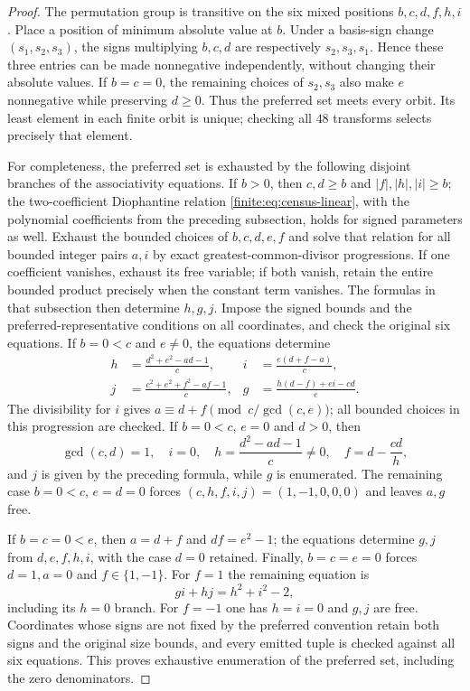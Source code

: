 \begin{proof}
The permutation group is transitive on the six mixed positions
$b,c,d,f,h,i$. Place a position of minimum absolute value at $b$.
Under a basis-sign change $(s_1,s_2,s_3)$, the signs multiplying
$b,c,d$ are respectively $s_2,s_3,s_1$. Hence these three entries
can be made nonnegative independently, without changing their
absolute values. If $b=c=0$, the remaining choices of $s_2,s_3$
also make $e$ nonnegative while preserving $d\geq0$.
Thus the preferred set meets every orbit. Its least element in
each finite orbit is unique; checking all $48$ transforms selects
precisely that element.

For completeness, the preferred set is exhausted by the following
disjoint branches of the associativity equations. If $b>0$, then
$c,d\geq b$ and $|f|,|h|,|i|\geq b$; the two-coefficient
Diophantine relation \eqref{finite:eq:census-linear}, with the polynomial
coefficients from the preceding subsection, holds for signed
parameters as well. Exhaust the bounded choices of $b,c,d,e,f$
and solve that relation for all bounded integer pairs $a,i$ by
exact greatest-common-divisor progressions. If one coefficient
vanishes, exhaust its free variable; if both vanish, retain the
entire bounded product precisely when the constant term vanishes.
The formulas in that subsection then determine $h,g,j$. Impose the
signed bounds and the preferred-representative conditions on all
coordinates, and check the original six equations.
If $b=0<c$ and $e\ne0$, the equations determine
\begin{align*}
 h&=\frac{d^2+e^2-ad-1}{c},&
 i&=\frac{e(d+f-a)}c,\\
 j&=\frac{c^2+e^2+f^2-af-1}{c},&
 g&=\frac{h(d-f)+ei-cd}{e}.
\end{align*}
The divisibility for $i$ gives
$a\equiv d+f\pmod{c/\gcd(c,e)}$; all bounded choices in this
progression are checked. If $b=0<c$, $e=0$ and $d>0$, then
\[
 \gcd(c,d)=1,\quad i=0,\quad
 h=\frac{d^2-ad-1}{c}\ne0,\quad f=d-\frac{cd}{h},
\]
and $j$ is given by the preceding formula, while $g$ is enumerated.
The remaining case $b=0<c$, $e=d=0$ forces
$(c,h,f,i,j)=(1,-1,0,0,0)$ and leaves $a,g$ free.

If $b=c=0<e$, then $a=d+f$ and $df=e^2-1$;
the equations determine $g,j$ from $d,e,f,h,i$, with the case
$d=0$ retained. Finally, $b=c=e=0$ forces $d=1,a=0$ and
$f\in\{1,-1\}$. For $f=1$ the remaining equation is
\[
 gi+hj=h^2+i^2-2,
\]
including its $h=0$ branch. For $f=-1$ one has $h=i=0$
and $g,j$ are free. Coordinates whose signs are not fixed by the
preferred convention retain both signs and the original size
bounds, and every emitted tuple is checked
against all six equations. This proves exhaustive enumeration
of the preferred set, including the zero denominators.


\end{proof}
